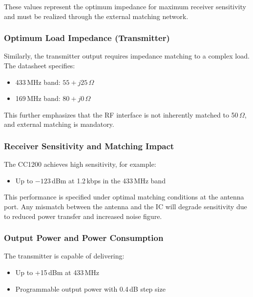 These values represent the optimum impedance for maximum receiver sensitivity and must be realized through the external matching network. \cite{cc1200_datasheet}

\subsubsection{Optimum Load Impedance (Transmitter)}

Similarly, the transmitter output requires impedance matching to a complex load. The datasheet specifies:

\begin{itemize}
    \item 433\,MHz band: $55 + j25\,\Omega$
    \item 169\,MHz band: $80 + j0\,\Omega$
\end{itemize}

This further emphasizes that the RF interface is not inherently matched to 50\,$\Omega$, and external matching is mandatory. \cite{cc1200_datasheet}

\subsubsection{Receiver Sensitivity and Matching Impact}

The CC1200 achieves high sensitivity, for example:

\begin{itemize}
    \item Up to $-123$\,dBm at 1.2\,kbps in the 433\,MHz band
\end{itemize}

This performance is specified under optimal matching conditions at the antenna port. Any mismatch between the antenna and the IC will degrade sensitivity due to reduced power transfer and increased noise figure. \cite{cc1200_datasheet}

\subsubsection{Output Power and Power Consumption}

The transmitter is capable of delivering:

\begin{itemize}
    \item Up to +15\,dBm at 433\,MHz
    \item Programmable output power with 0.4\,dB step size
\end{itemize}

